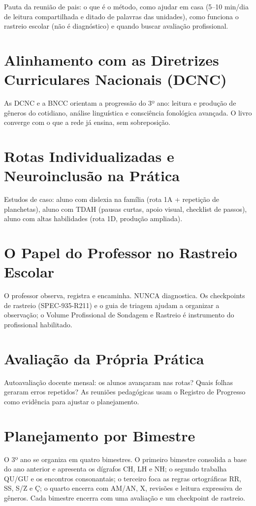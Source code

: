 Pauta da reunião de pais: o que é o método, como ajudar em casa (5–10 min/dia de leitura compartilhada e ditado de palavras das unidades), como funciona o rastreio escolar (não é diagnóstico) e quando buscar avaliação profissional.


\chapter{Alinhamento com as Diretrizes Curriculares Nacionais (DCNC)}

As DCNC e a BNCC orientam a progressão do 3º ano: leitura e produção de gêneros do cotidiano, análise linguística e consciência fonológica avançada. O livro converge com o que a rede já ensina, sem sobreposição.


\chapter{Rotas Individualizadas e Neuroinclusão na Prática}

Estudos de caso: aluno com dislexia na família (rota 1A + repetição de planchetas), aluno com TDAH (pausas curtas, apoio visual, checklist de passos), aluno com altas habilidades (rota 1D, produção ampliada).


\chapter{O Papel do Professor no Rastreio Escolar}

O professor observa, registra e encaminha. NUNCA diagnostica. Os checkpoints de rastreio (SPEC-935-R211) e o guia de triagem ajudam a organizar a observação; o Volume Profissional de Sondagem e Rastreio é instrumento do profissional habilitado.


\chapter{Avaliação da Própria Prática}

Autoavaliação docente mensal: os alunos avançaram nas rotas? Quais folhas geraram erros repetidos? As reuniões pedagógicas usam o Registro de Progresso como evidência para ajustar o planejamento.


\chapter{Planejamento por Bimestre}

O 3º ano se organiza em quatro bimestres. O primeiro bimestre consolida a base do ano anterior e apresenta os dígrafos CH, LH e NH; o segundo trabalha QU/GU e os encontros consonantais; o terceiro foca as regras ortográficas RR, SS, S/Z e Ç; o quarto encerra com AM/AN, X, revisões e leitura expressiva de gêneros. Cada bimestre encerra com uma avaliação e um checkpoint de rastreio.


